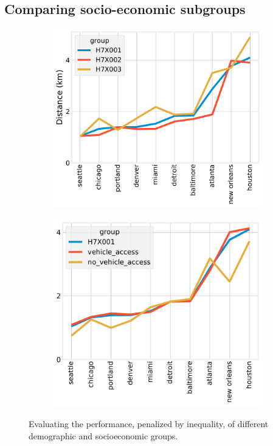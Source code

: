 \documentclass[final,3p,times,onecolumn,sort&compress]{elsarticle}
\begin{document}
\subsection{Comparing socio-economic subgroups}
\begin{figure}[]
    \begin{subfigure}{0.5\textwidth}
        \includegraphics[width=0.9\linewidth]{report/fig/ede_subgroup_race_-1.0.pdf} 
    \end{subfigure}
    \begin{subfigure}{0.5\textwidth}
        \includegraphics[width=0.9\linewidth]{report/fig/ede_subgroup_vehicle_-1.0.pdf} 
    \end{subfigure}
    \caption{
    Evaluating the performance, penalized by inequality, of different demographic and socioeconomic groups.
    }
    \label{fig:subgroup}
\end{figure}
\end{document}
